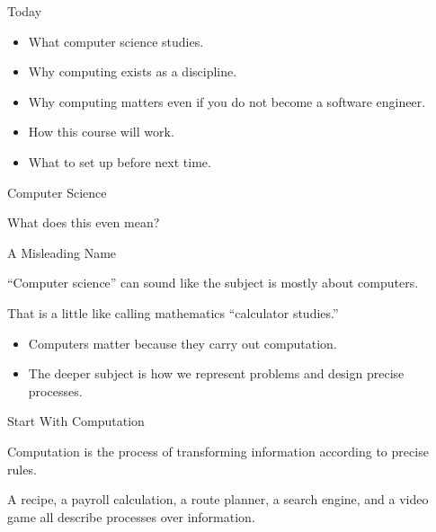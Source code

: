 \documentclass[aspectratio=169]{beamer}
\begin{document}
\begin{frame}{Today}
  \begin{itemize}
    \item What computer science studies.
    \item Why computing exists as a discipline.
    \item Why computing matters even if you do not become a software engineer.
    \item How this course will work.
    \item What to set up before next time.
  \end{itemize}
\end{frame}


\begin{frame}{Computer Science}
  \begin{center}
    {\Huge What does this even mean?}
  \end{center}
\end{frame}

\begin{frame}{A Misleading Name}
  \begin{keyidea}
    ``Computer science'' can sound like the subject is mostly about computers.
  \end{keyidea}
  \vspace{0.12in}
  \begin{exampleblockcp}
    That is a little like calling mathematics ``calculator studies.''
  \end{exampleblockcp}
  \vspace{0.12in}
  \begin{itemize}
    \item Computers matter because they carry out computation.
    \item The deeper subject is how we represent problems and design precise processes.
  \end{itemize}
\end{frame}

\begin{frame}{Start With Computation}
  \begin{cpdefinition}
    Computation is the process of transforming information according to precise rules.
  \end{cpdefinition}
  \vspace{0.12in}
  \begin{exampleblockcp}
    A recipe, a payroll calculation, a route planner, a search engine, and a video game all describe processes over information.
  \end{exampleblockcp}
\end{frame}
\end{document}
